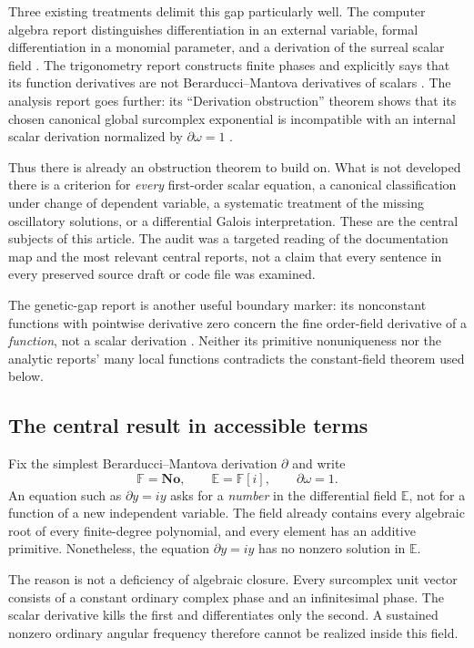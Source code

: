 \documentclass[11pt,a4paper]{article}
\numberwithin{equation}{section}
\theoremstyle{definition}
\theoremstyle{remark}
\newcommand{\No}{\mathbf{No}}
\newcommand{\F}{\mathbb F}
\newcommand{\E}{\mathbb E}
\newcommand{\D}{\partial}
\begin{document}
Three existing treatments delimit this gap particularly well. The computer
algebra report distinguishes differentiation in an external variable,
formal differentiation in a monomial parameter, and a derivation of the
surreal scalar field \cite[section with source label
\texttt{cas:sec-derivatives}]{RepoCAS}. The trigonometry report constructs
finite phases and explicitly says that its function derivatives are not
Berarducci--Mantova derivatives of scalars \cite{RepoTrig}. The analysis report
goes further: its ``Derivation obstruction'' theorem shows that its chosen
canonical global surcomplex exponential is incompatible with an internal
scalar derivation normalized by $\D\omega=1$ \cite[source label
\texttt{b:derivation-obstruction}]{RepoAnalysis}.

Thus there is already an obstruction theorem to build on. What is not
developed there is a criterion for \emph{every} first-order scalar equation,
a canonical classification under change of dependent variable, a systematic
treatment of the missing oscillatory solutions, or a differential Galois
interpretation. These are the central subjects of this article. The audit was
a targeted reading of the documentation map and the most relevant central
reports, not a claim that every sentence in every preserved source draft or
code file was examined.

The genetic-gap report is another useful boundary marker: its nonconstant
functions with pointwise derivative zero concern the fine order-field
derivative of a \emph{function}, not a scalar derivation \cite{RepoGaps}.
Neither its primitive nonuniqueness nor the analytic reports' many local
functions contradicts the constant-field theorem used below.

\subsection{The central result in accessible terms}
Fix the simplest Berarducci--Mantova derivation $\D$ and write
\[
 \F=\No,\qquad \E=\F[i],\qquad \D\omega=1.
\]
An equation such as $\D y=iy$ asks for a \emph{number} in the differential
field $\E$, not for a function of a new independent variable. The field
already contains every algebraic root of every finite-degree polynomial,
and every element has an additive primitive. Nonetheless, the equation
$\D y=iy$ has no nonzero solution in $\E$.

The reason is not a deficiency of algebraic closure. Every surcomplex unit
vector consists of a constant ordinary complex phase and an infinitesimal
phase. The scalar derivative kills the first and differentiates only the
second. A sustained nonzero ordinary angular frequency therefore cannot be
realized inside this field.
\end{document}
